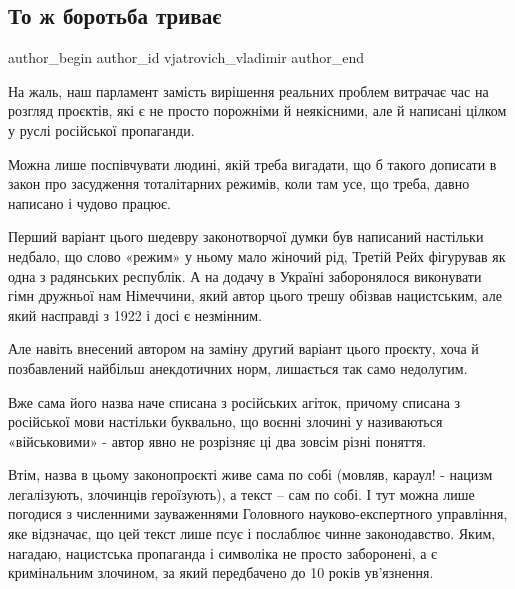  
 
 
 
 
 
\subsection{То ж боротьба триває}
\label{sec:03_06_2021.fb.vjatrovich_vladimir.1.borjba_zakon}
\ifcmt
 author_begin
   author_id vjatrovich_vladimir
 author_end
\fi

На жаль, наш парламент замість вирішення реальних проблем витрачає час на
розгляд проєктів, які є не просто порожніми й неякісними, але й написані цілком
у руслі російської пропаганди.

Можна лише поспівчувати людині, якій треба вигадати, що б такого дописати в
закон про засудження тоталітарних режимів, коли там усе, що треба, давно
написано і чудово працює.

Перший варіант цього шедевру законотворчої думки був написаний настільки
недбало, що слово «режим» у ньому мало жіночий рід, Третій Рейх фігурував як
одна з радянських республік. А на додачу в Україні заборонялося виконувати гімн
дружньої нам Німеччини, який автор цього трешу обізвав нацистським, але  який
насправді з 1922 і досі є незмінним. 

Але навіть внесений автором на заміну другий варіант цього проєкту, хоча й
позбавлений найбільш анекдотичних норм, лишається так само недолугим. 

Вже сама його назва наче списана з російських агіток, причому списана з
російської мови настільки буквально, що воєнні злочині у називаються
«військовими» - автор явно не розрізняє ці два зовсім різні поняття.

Втім, назва в цьому законопроєкті живе сама по собі (мовляв, караул! - нацизм
легалізують, злочинців героїзують),  а текст – сам по собі. І  тут можна лише
погодися з численними зауваженнями Головного науково-експертного управління,
яке відзначає, що цей текст лише псує і послаблює чинне законодавство. Яким,
нагадаю, нацистська пропаганда і символіка не просто заборонені, а є
кримінальним злочином, за який передбачено до 10 років ув’язнення. 

